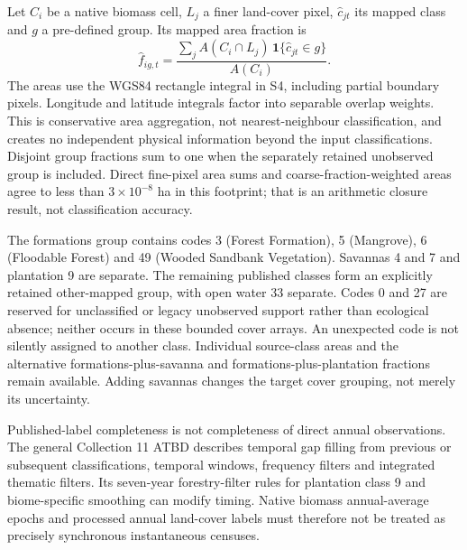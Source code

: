 \documentclass[11pt,a4paper]{article}
\begin{document}
Let $C_i$ be a native biomass cell, $L_j$ a finer land-cover pixel, $\widehat c_{jt}$ its mapped class and $g$ a pre-defined group. Its mapped area fraction is
\begin{equation}
\widehat f_{ig,t}=\frac{\sum_j A(C_i\cap L_j)\,\mathbf1\{\widehat c_{jt}\in g\}}{A(C_i)}.
\end{equation}
The areas use the WGS84 rectangle integral in S4, including partial boundary pixels. Longitude and latitude integrals factor into separable overlap weights. This is conservative area aggregation, not nearest-neighbour classification, and creates no independent physical information beyond the input classifications. Disjoint group fractions sum to one when the separately retained unobserved group is included. Direct fine-pixel area sums and coarse-fraction-weighted areas agree to less than $3\times10^{-8}$ ha in this footprint; that is an arithmetic closure result, not classification accuracy.

The formations group contains codes 3 (Forest Formation), 5 (Mangrove), 6 (Floodable Forest) and 49 (Wooded Sandbank Vegetation). Savannas 4 and 7 and plantation 9 are separate. The remaining published classes form an explicitly retained other-mapped group, with open water 33 separate. Codes 0 and 27 are reserved for unclassified or legacy unobserved support rather than ecological absence; neither occurs in these bounded cover arrays. An unexpected code is not silently assigned to another class. Individual source-class areas and the alternative formations-plus-savanna and formations-plus-plantation fractions remain available. Adding savannas changes the target cover grouping, not merely its uncertainty.

Published-label completeness is not completeness of direct annual observations. The general Collection 11 ATBD describes temporal gap filling from previous or subsequent classifications, temporal windows, frequency filters and integrated thematic filters. Its seven-year forestry-filter rules for plantation class 9 and biome-specific smoothing can modify timing. Native biomass annual-average epochs and processed annual land-cover labels must therefore not be treated as precisely synchronous instantaneous censuses.
\end{document}
